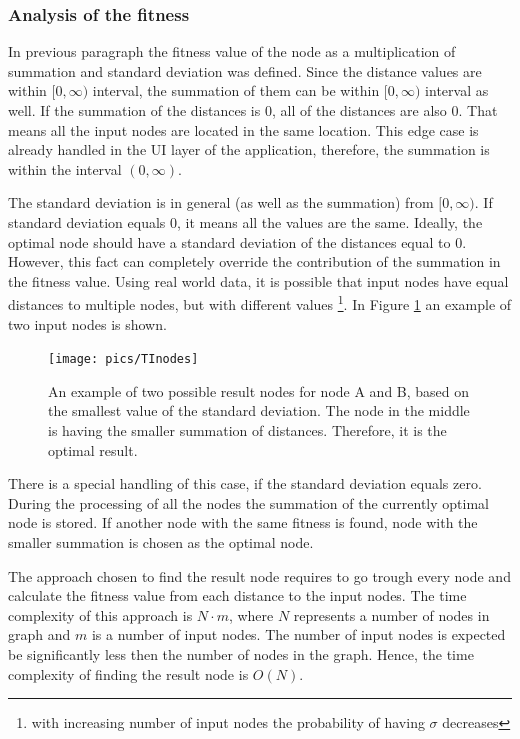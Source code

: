 \documentclass[thesis=M,english]{FITthesis}[2012/10/20]
\begin{document}
\subsubsection{Analysis of the fitness}
In previous paragraph the fitness value of the node as a multiplication of summation and standard deviation was defined. Since the distance values are within $[0, \infty)$ interval, the summation of them can be within $[0, \infty)$ interval as well. If the summation of the distances is $0$, all of the distances are also $0$. That means all the input nodes are located in the same location. This edge case is already handled in the UI layer of the application, therefore, the summation is within the interval $(0, \infty)$.

The standard deviation is in general (as well as the summation) from $[0, \infty)$. If standard deviation equals $0$, it means all the values are the same. Ideally, the optimal node should have a standard deviation of the distances equal to $0$. However, this fact can completely override the contribution of the summation in the fitness value. Using real world data, it is possible that input nodes have equal distances to multiple nodes, but with different values \footnote{with increasing number of input nodes the probability of having $\sigma$ decreases}. In Figure \ref{fig:TInodes} an example of two input nodes is shown.



\begin{figure}[H]
\centering
\texttt{[image: pics/TInodes]}
\caption{An example of two possible result nodes for node A and B, based on the smallest value of the standard deviation. The node in the middle is having the smaller summation of distances. Therefore, it is the optimal result.}
\label{fig:TInodes}
\end{figure}


There is a special handling of this case, if the standard deviation equals zero. During the processing of all the nodes the summation of the currently optimal node is stored. If another node with the same fitness is found, node with the smaller summation is chosen as the optimal node. 

The approach chosen to find the result node requires to go trough every node and calculate the fitness value from each distance to the input nodes. The time complexity of this approach is $N \cdot m$, where $N$ represents a number of nodes in graph and $m$ is a number of input nodes. The number of input nodes is expected be significantly less then the number of nodes in the graph. Hence, the time complexity of finding the result node is $O(N)$. 
\end{document}
